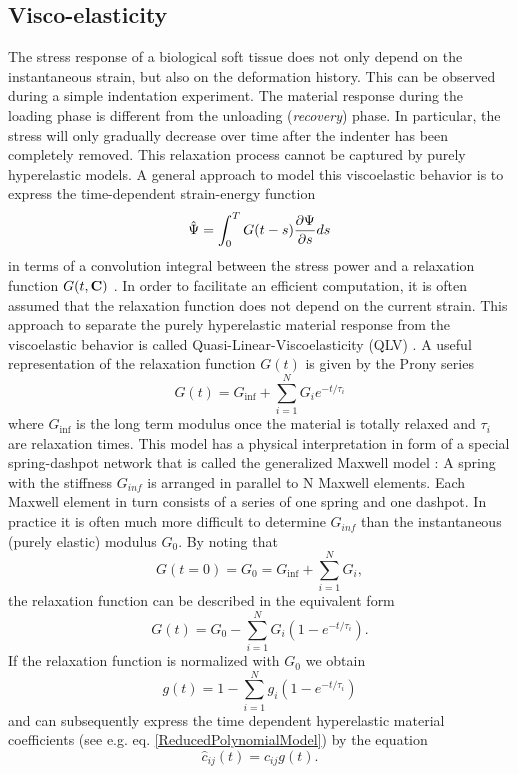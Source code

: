 \subsection{Visco-elasticity}
\label{Viscoelasticity}

The stress response of a biological soft tissue does not only depend on the instantaneous strain, but also on the deformation history. This can be observed during a simple indentation experiment. The material response during the loading phase is different from the unloading (\emph{recovery}) phase. In particular, the stress will only gradually decrease over time after the indenter has been completely removed. This relaxation process cannot be captured by purely hyperelastic models. A general approach to model this viscoelastic behavior is to express the time-dependent strain-energy function  
 \begin{equation}
 \hat{\Psi} = \int _0 ^T G(t-s) \frac{\partial \Psi}{\partial s} ds
\end{equation}
in terms of a convolution integral between the stress power and a relaxation function $G(t, \mathbf {C} )$ \cite{Taylor2008a}. In order to facilitate an efficient computation, it is often assumed that the relaxation function does not depend on the current strain. This approach to separate the purely hyperelastic material response from the viscoelastic behavior is called Quasi-Linear-Viscoelasticity (QLV) \cite{Fung1993}. A useful representation of the relaxation function $G(t)$ is given by the Prony series
 \begin{equation}
G(t) = G_{\inf} + \sum _{i=1} ^N G_i e^{-t/\tau _i}
\end{equation}
where $G_{\inf}$ is the long term modulus once the material is totally relaxed and $\tau _i$ are relaxation times. This model has a physical interpretation in form of a special spring-dashpot network that is called the generalized Maxwell model \cite{Holzapfel2000}: A spring with the stiffness $G_{inf}$ is arranged in parallel to N Maxwell elements. Each Maxwell element in turn consists of a series of one spring and one dashpot. In practice it is often much more difficult to determine $G_{inf}$ than the instantaneous (purely elastic) modulus $G_0$. By noting that
 \begin{equation}
G(t=0) = G_{0} =  G_{\inf} + \sum _{i=1} ^N G_i,
\end{equation}
the relaxation function can be described in the equivalent form
 \begin{equation}
G(t) = G_{0} - \sum _{i=1} ^N G_i (1- e^{-t/\tau _i}).
\end{equation}
If the relaxation function is normalized with $G_0$ we obtain 
 \begin{equation}
g(t) = 1 - \sum _{i=1} ^N g_i (1- e^{-t/\tau _i})
\label{EqRelaxationCoeffs}
\end{equation}
and can subsequently express the time dependent hyperelastic material coefficients (see e.g. eq. \ref{ReducedPolynomialModel}) by the equation
 \begin{equation}
\hat c_{ij}(t) = c_{ij} g(t).
\end{equation}

